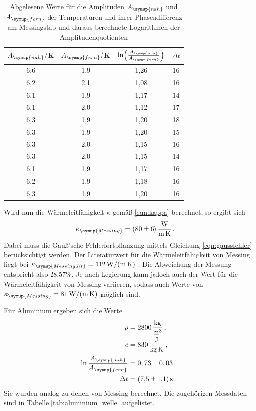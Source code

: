 \begin{table}
  \centering
  \caption{Abgelesene Werte für die Amplituden $A_{\symup{nah}}$ und $A_{\symup{fern}}$ der Temperaturen und
  ihrer Phasendifferenz am Messingstab und daraus berechnete Logarithmen der Amplitudenquotienten}
  \label{tab:messing_welle}
  \begin{tabular}{c c c c}
    \toprule
     $A_{\symup{nah}}/$K  & $A_{\symup{fern}}/$K & $\ln\Bigl(\frac{A_{\symup{nah}}}{A_{\symup{fern}}}\Bigr)$ & $\Delta t$ \\
    \midrule
    6,6 & 1,9 & 1,26  & 16  \\
    6,2 & 2,1 & 1,08  & 16  \\
    6,1 & 1,9 & 1,17  & 14  \\
    6,1 & 2,0 & 1,12  & 17  \\
    6,3 & 1,9 & 1,20  & 18  \\
    6,3 & 1,9 & 1,20  & 15  \\
    6,3 & 2,0 & 1,15  & 16  \\
    6,3 & 2,0 & 1,15  & 14  \\
    6,1 & 1,9 & 1,17  & 16  \\
    6,2 & 1,9 & 1,18  & 16  \\
    6,3 & 1,9 & 1,20  & 16  \\
    \bottomrule
  \end{tabular}
\end{table}

Wird nun die Wärmeleitfähigkeit $\kappa$ gemäß \eqref{eqn:kappa} berechnet, so ergibt sich
\begin{align}
  \kappa_{\symup{Messing}} &= \SI{80(6)}{\watt\per\meter\per\kelvin}\,.\nonumber
\end{align}
Dabei muss die Gauß'sche Fehlerfortpflanzung mittels Gleichung \eqref{eqn:gaussfehler}
berücksichtigt werden.
Der Literaturwert für die Wärmeleitfähigkeit von Messing liegt bei
$\kappa_{\symup{Messing,lit}}=\SI{112}{\watt\per\meter\per\kelvin}$ \cite{Wärmeleitfähigkeit1}.
Die Abweichung der Messung entspricht also 28,57\%. Je nach Legierung kann
jedoch auch der Wert für die Wärmeleitfähigkeit von Messing variieren, sodass auch Werte von
$\kappa_{\symup{Messing}} = \SI{81}{\watt\per\meter\per\kelvin}$ \cite{Wärmeleitfähigkeit2}
möglich sind.




Für Aluminium ergeben sich die Werte
\begin{align}
  \rho &= \SI{2800}{\kilo\gram\per\cubic\meter}\,, \nonumber\\
  c &= \SI{830}{\joule\per\kilo\gram\per\kelvin}\,, \nonumber\\
  \ln{\frac{A_{\symup{nah}}}{A_{\symup{fern}}}} &= 0,73 \pm 0,03 \,, \nonumber\\
  \Delta t &= \SI{7.5(11)}{\second} \,.\nonumber
\end{align}
Sie wurden analog zu denen von Messing berechnet. Die zugehörigen Messdaten sind
in Tabelle \ref{tab:aluminium_welle} aufgelistet.

